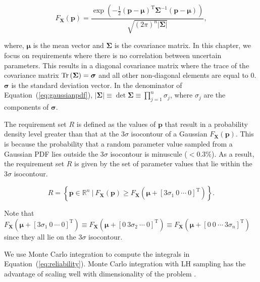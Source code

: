 \begin{equation} \label{eq:gaussianpdf}
	F_\mathbf{X}(\mathbf{p})={\frac {\exp \left(-{\frac {1}{2}}({\mathbf {p} }-{\boldsymbol {\mu }})^{\mathrm {T} }{\boldsymbol {\Sigma }}^{-1}({\mathbf {p} }-{\boldsymbol {\mu }})\right)}{\sqrt {(2\pi )^{n}|{\boldsymbol {\Sigma }}|}}},
\end{equation}

where, $\boldsymbol{\mu}$ is the mean vector and $\boldsymbol{\Sigma}$ is the covariance matrix. In this chapter, we focus on requirements where there is no correlation between uncertain parameters. This results in a diagonal covariance matrix where the trace of the covariance matrix $\operatorname{Tr}\left(\boldsymbol{\Sigma}\right) = \boldsymbol{\sigma}$ and all other non-diagonal elements are equal to 0. $\boldsymbol{\sigma}$ is the standard deviation vector. In the denominator of Equation~(\ref{eq:gaussianpdf}), $|{\boldsymbol {\Sigma }}|\equiv \det {\boldsymbol {\Sigma }} \equiv \prod\limits_{j=1}^{n} \sigma_j$, where $\sigma_j$ are the components of $\boldsymbol{\sigma}$.

The requirement set $R$ is defined as the values of $\mathbf{p}$ that result in a probability density level greater than that at the $3{\sigma}$ isocontour of a Gaussian $F_\mathbf{X}(\mathbf{p})$. This is because the probability that a random parameter value sampled from a Gaussian \ac{PDF} lies outside the $3{\sigma}$ isocontour is minuscule ($<0.3\%$). As a result, the requirement set $R$ is given by the set of parameter values that lie within the $3\sigma$ isocontour.

\begin{equation} \label{eq:requirementsetgaussian}
	\textit{R} = \left\{\mathbf{p} \in \mathbb{R}^n~|~F_\mathbf{X}(\mathbf{p}) \geq F_\mathbf{X}(\boldsymbol{\mu} + \left[3\sigma_1~0~\cdots~0\right]^\mathrm{T}) \right\}.
\end{equation}

Note that $F_\mathbf{X}(\boldsymbol{\mu} + \left[3\sigma_1~0~\cdots~0\right]^\mathrm{T}) \equiv F_\mathbf{X}(\boldsymbol{\mu} + \left[0~3\sigma_2~\cdots~0\right]^\mathrm{T}) \equiv F_\mathbf{X}(\boldsymbol{\mu} + \left[0~0~\cdots~3\sigma_n\right]^\mathrm{T})$ since they all lie on the $3\sigma$ isocontour.

We use Monte Carlo integration to compute the integrals in Equation~(\ref{eq:reliability}). Monte Carlo integration with \acf{LH} sampling has the advantage of scaling well with dimensionality of the problem \cite{Magnusen1997,Zhang2016}.


